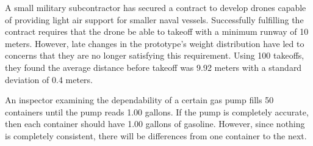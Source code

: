 \documentclass[addpoints]{examsetup}
\begin{document}




\examCoverPage

\begin{questions}
 

\question
A small military subcontractor has secured a contract to develop drones capable of providing light air support for smaller naval vessels. Successfully fulfilling the contract requires that the drone be able to takeoff with a minimum runway of 10 meters. However, late changes in the prototype's weight distribution have led to concerns that they are no longer satisfying this requirement. Using 100 takeoffs, they found the average distance before takeoff was 9.92 meters with a standard deviation of 0.4 meters. 







\question

An inspector examining the dependability of a certain gas pump fills 50 containers until the pump reads 1.00 gallons. 
If the pump is completely accurate, then each container should have 1.00 gallons of gasoline.
However, since nothing is completely consistent, there will be differences from one container to the next.


\end{questions}
\end{document}
